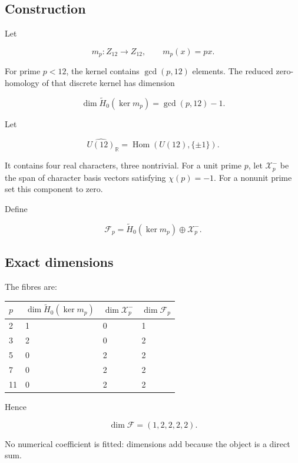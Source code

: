 \documentclass[11pt,a4paper,openany]{report}
\begin{document}
\subsection{Construction}

Let

\[
m_p:Z_{12}\to Z_{12},
\qquad
m_p(x)=px.
\]

For prime \(p<12\), the kernel contains \(\gcd(p,12)\) elements. The reduced zero-homology of that discrete kernel has dimension

\[
\dim\widetilde H_0(\ker m_p)
=\gcd(p,12)-1.
\]

Let

\[
\widehat{U(12)}_{\mathbb R}
=
\operatorname{Hom}(U(12),\{\pm1\}).
\]

It contains four real characters, three nontrivial. For a unit prime \(p\), let \(\mathcal X_p^-\) be the span of character basis vectors satisfying \(\chi(p)=-1\). For a nonunit prime set this component to zero.

Define

\[
\mathcal F_p
=
\widetilde H_0(\ker m_p)
\oplus
\mathcal X_p^-.
\]

\subsection{Exact dimensions}

The fibres are:

\begin{center}
\begingroup\small
\setlength{\tabcolsep}{3.5pt}
\renewcommand{\arraystretch}{1.16}
\begin{longtable}{@{}p{}p{}p{}p{}@{}}
\toprule
\textbf{\(p\)} & \textbf{\(\dim\widetilde H_0(\ker m_p)\)} & \textbf{\(\dim\mathcal X_p^-\)} & \textbf{\(\dim\mathcal F_p\)} \\
\midrule
\endhead
2 & 1 & 0 & 1 \\
3 & 2 & 0 & 2 \\
5 & 0 & 2 & 2 \\
7 & 0 & 2 & 2 \\
11 & 0 & 2 & 2 \\
\bottomrule
\end{longtable}
\endgroup
\end{center}

Hence

\[
\dim\mathcal F=(1,2,2,2,2).
\]

No numerical coefficient is fitted: dimensions add because the object is a direct sum.
\end{document}
